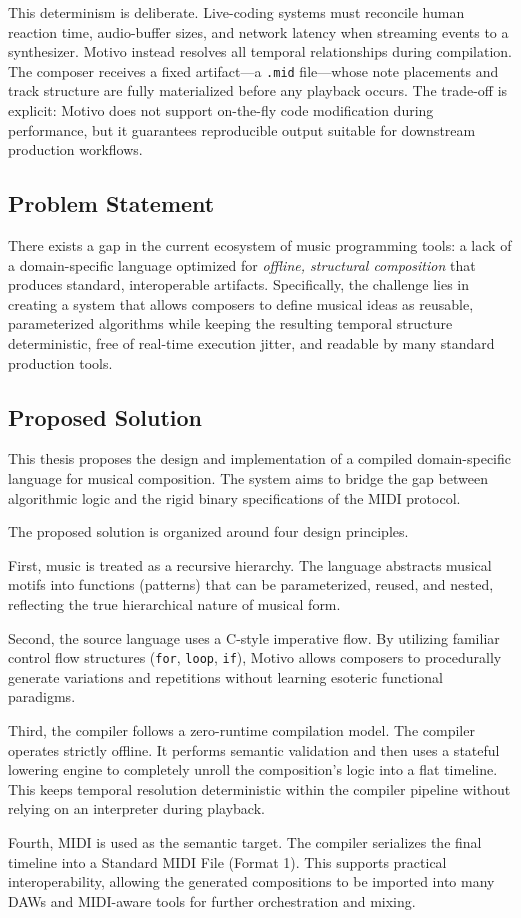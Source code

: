 This determinism is deliberate.
Live-coding systems must reconcile human reaction time, audio-buffer sizes, and network latency when streaming events to
a synthesizer.
Motivo instead resolves all temporal relationships during compilation.
The composer receives a fixed artifact---a \texttt{.mid} file---whose note placements and track structure are fully
materialized before any playback occurs.
The trade-off is explicit: Motivo does not support on-the-fly code modification during performance, but it guarantees
reproducible output suitable for downstream production workflows.

\subsection{Problem Statement}\label{subsec:problem-statement}

There exists a gap in the current ecosystem of music programming tools: a lack of a domain-specific language optimized
for \textit{offline, structural composition} that produces standard, interoperable artifacts.
Specifically, the challenge lies in creating a system that allows composers to define musical ideas as reusable,
parameterized algorithms while keeping the resulting temporal structure deterministic, free of real-time
execution jitter,
and readable by many standard production tools.

\subsection{Proposed Solution}\label{subsec:proposed-solution}

This thesis proposes the design and implementation of a compiled domain-specific language
for musical
composition.
The system aims to bridge the gap between algorithmic logic and the rigid binary specifications of the MIDI protocol.

The proposed solution is organized around four design principles.

First, music is treated as a recursive hierarchy. The language abstracts musical motifs into functions (patterns) that
can be parameterized, reused, and nested, reflecting the true hierarchical nature of musical form.

Second, the source language uses a C-style imperative flow. By utilizing familiar control flow structures
(\texttt{for}, \texttt{loop},
\texttt{if}), Motivo allows composers to procedurally generate variations and repetitions without learning esoteric
functional paradigms.

Third, the compiler follows a zero-runtime compilation model. The compiler operates strictly offline.
It performs semantic validation and then uses a stateful lowering engine to completely unroll the composition's
logic into a flat timeline.
This keeps temporal resolution deterministic within the compiler pipeline without relying on an interpreter
during playback.

Fourth, MIDI is used as the semantic target. The compiler serializes the final timeline into a Standard MIDI File
(Format 1).
This supports practical interoperability, allowing the generated compositions to be imported into many DAWs
and MIDI-aware tools for
further orchestration and mixing.
